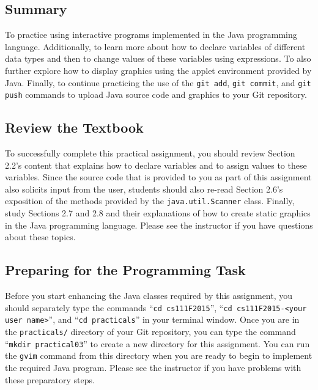 


\vspace*{-.1in}
\subsection*{Summary}

To practice using interactive programs implemented in the Java programming language. Additionally, to learn more about
how to declare variables of different data types and then to change values of these variables using expressions.  To
also further explore how to display graphics using the applet environment provided by Java. Finally, to continue
practicing the use of the {\tt git add}, {\tt git commit}, and {\tt git push} commands to upload Java source code and
graphics to your Git repository.

\vspace*{-.1in}
\subsection*{Review the Textbook}

To successfully complete this practical assignment, you should review Section 2.2's content that explains how to declare
variables and to assign values to these variables. Since the source code that is provided to you as part of this
assignment also solicits input from the user, students should also re-read Section 2.6's exposition of the methods
provided by the {\tt java.util.Scanner} class. Finally, study Sections 2.7 and 2.8 and their explanations of how to
create static graphics in the Java programming language.  Please see the instructor if you have questions about
these topics.

\vspace*{-.1in}
\subsection*{Preparing for the Programming Task}

Before you start enhancing the Java classes required by this assignment, you should separately type the commands ``{\tt cd
  cs111F2015}'', ``{\tt cd cs111F2015-<your user name>}'', and ``{\tt cd practicals}'' in your terminal window. Once you
are in the {\tt practicals/} directory of your Git repository, you can type the command ``{\tt mkdir practical03}'' to
create a new directory for this assignment. You can run the {\tt gvim} command from this directory when you are ready to
begin to implement the required Java program. Please see the instructor if you have problems with these preparatory steps.

